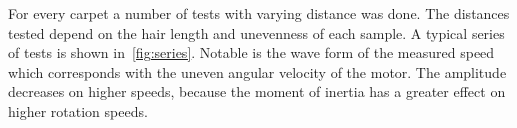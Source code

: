 \documentclass[12pt,a4paper]{article}
\begin{document}
For every carpet a number of tests with varying distance was done.
The distances tested depend on the hair length and unevenness of each sample.
A typical series of tests is shown in~\autoref{fig:series}. 
Notable is the wave form of the measured speed which corresponds with the uneven angular velocity of the motor.
The amplitude decreases on higher speeds, because the moment of inertia has a greater effect on higher rotation speeds.

\begin{figure}[htbp]
  \begin{center}
    \mbox{
      \quad
      }
    \mbox{
       \quad
}
\end{center}
\end{figure}
\end{document}

